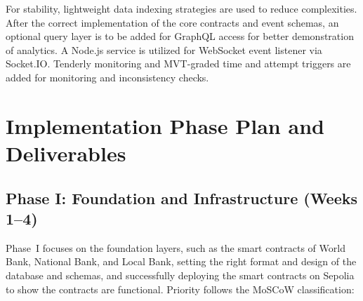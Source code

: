 \documentclass[12pt,a4paper]{report}
\begin{document}
For stability, lightweight data indexing strategies are used to reduce complexities. After the correct implementation of the core contracts and event schemas, an optional query layer is to be added for GraphQL access for better demonstration of analytics. A Node.js service is utilized for WebSocket event listener via Socket.IO. Tenderly monitoring and MVT-graded time and attempt triggers are added for monitoring and inconsistency checks.

\section{Implementation Phase Plan and Deliverables}
\label{sec:impl-phase-plan}

\subsection{Phase I: Foundation and Infrastructure (Weeks 1--4)}

Phase~I focuses on the foundation layers, such as the smart contracts of World Bank, National Bank, and Local Bank, setting the right format and design of the database and schemas, and successfully deploying the smart contracts on Sepolia to show the contracts are functional. Priority follows the MoSCoW classification:
\end{document}
